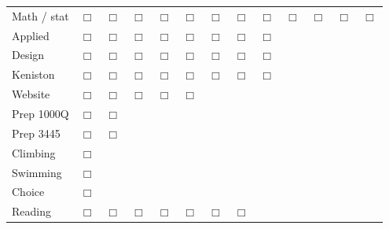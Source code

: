 \begin{tabular}{lcccccccccccc}
Math / stat & $\Box$ & $\Box$ & $\Box$ & $\Box$ & $\Box$ & $\Box$ &
                                                                 $\Box$ & $\Box$ & $\Box$ & $\Box$ & $\Box$ & $\Box$ \\
Applied & $\Box$ & $\Box$ & $\Box$ & $\Box$ & $\Box$ & $\Box$ & $\Box$ & $\Box$
  & & & & \\
Design & $\Box$ & $\Box$ & $\Box$ & $\Box$ & $\Box$ & $\Box$ & $\Box$ & $\Box$
  & & & & \\
\midrule Keniston & $\Box$ & $\Box$ & $\Box$ & $\Box$ & $\Box$ & $\Box$ &
                                                                 $\Box$ & $\Box$
  & & & \\
Website & $\Box$ & $\Box$ & $\Box$ & $\Box$ & $\Box$ & & & & & & & \\
Prep 1000Q & $\Box$ & $\Box$ & & & & & & & & & & \\
Prep 3445 & $\Box$ & $\Box$ & & & & & & & & & & \\
\midrule
Climbing & $\Box$ & & & & & & & & & & & \\
Swimming & $\Box$ & & & & & & & & & & & \\
Choice & $\Box$ & & & & & & & & & & & \\
\midrule
Reading & $\Box$ & $\Box$ & $\Box$ & $\Box$ & $\Box$ & $\Box$ & $\Box$
  & & & & & \\
\end{tabular}